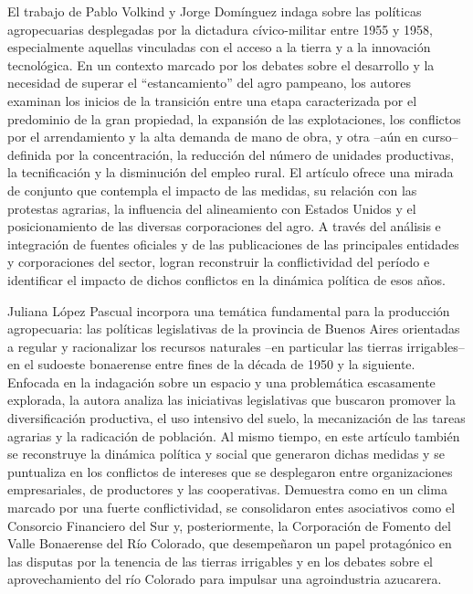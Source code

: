 El trabajo de Pablo Volkind y Jorge Domínguez indaga sobre las políticas agropecuarias desplegadas por la dictadura cívico-militar entre 1955 y 1958, especialmente aquellas vinculadas con el acceso a la tierra y a la innovación tecnológica. En un contexto marcado por los debates sobre el desarrollo y la necesidad de superar el “estancamiento” del agro pampeano, los autores examinan los inicios de la transición entre una etapa caracterizada por el predominio de la gran propiedad, la expansión de las explotaciones, los conflictos por el arrendamiento y la alta demanda de mano de obra, y otra –aún en curso– definida por la concentración, la reducción del número de unidades productivas, la tecnificación y la disminución del empleo rural. El artículo ofrece una mirada de conjunto que contempla el impacto de las medidas, su relación con las protestas agrarias, la influencia del alineamiento con Estados Unidos y el posicionamiento de las diversas corporaciones del agro. A través del análisis e integración de fuentes oficiales y de las publicaciones de las principales entidades y corporaciones del sector, logran reconstruir la conflictividad del período e identificar el impacto de dichos conflictos en la dinámica política de esos años.

Juliana López Pascual incorpora una temática fundamental para la producción agropecuaria: las políticas legislativas de la provincia de Buenos Aires orientadas a regular y racionalizar los recursos naturales –en particular las tierras irrigables– en el sudoeste bonaerense entre fines de la década de 1950 y la siguiente. Enfocada en la indagación sobre un espacio y una problemática escasamente explorada, la autora analiza las iniciativas legislativas que buscaron promover la diversificación productiva, el uso intensivo del suelo, la mecanización de las tareas agrarias y la radicación de población. Al mismo tiempo, en este artículo también se reconstruye la dinámica política y social que generaron dichas medidas y se puntualiza en los conflictos de intereses que se desplegaron entre organizaciones empresariales, de productores y las cooperativas. Demuestra como en un clima marcado por una fuerte conflictividad, se consolidaron entes asociativos como el Consorcio Financiero del Sur y, posteriormente, la Corporación de Fomento del Valle Bonaerense del Río Colorado, que desempeñaron un papel protagónico en las disputas por la tenencia de las tierras irrigables y en los debates sobre el aprovechamiento del río Colorado para impulsar una agroindustria azucarera.


